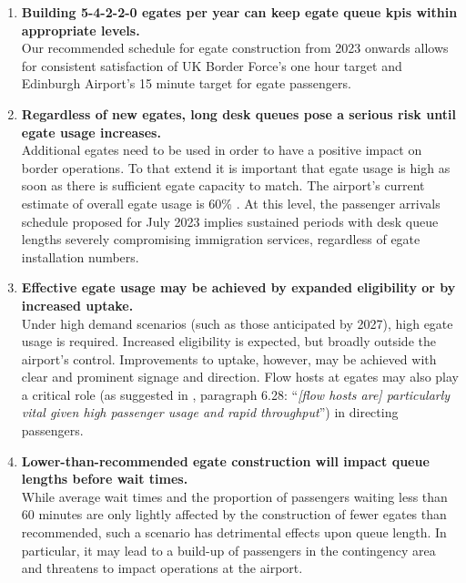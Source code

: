 \documentclass[10pt]{article}
\begin{document}
\vspace{4mm}
\begin{tcolorbox}[
colframe=edi-dark-purple,
colback=edi-light-purple,
fonttitle=\bfseries,
title = {Key Conclusions}]
\begin{enumerate}

    \item[\ding{40}] \textbf{Building 5-4-2-2-0 \glspl{egate} per year can keep \gls{egate} queue \glspl{kpi} within appropriate levels.}\\
    Our recommended schedule for \gls{egate} construction from 2023 onwards allows for consistent satisfaction of UK Border Force's one hour target and Edinburgh Airport's 15 minute target for \gls{egate} passengers.  \\ 
    \item[\ding{40}] \textbf{Regardless of new \glspl{egate}, long desk queues pose a serious risk until \gls{egate} usage increases.}\\
     Additional \glspl{egate} need to be used in order to have a positive impact on border operations. To that extend it is important that \gls{egate} usage is high as soon as there is sufficient \gls{egate} capacity to match. The airport's current estimate of overall \gls{egate} usage is 60\% \cite{modelling_competition}. At this level, the passenger arrivals schedule proposed for July 2023 implies sustained periods with desk queue lengths severely compromising immigration services, regardless of \gls{egate} installation numbers.\\
    
    \item[\ding{40}] \textbf{Effective \gls{egate} usage may be achieved by expanded eligibility or by increased uptake.}\\
    Under high demand scenarios (such as those anticipated by 2027), high \gls{egate} usage is required. Increased eligibility is expected, but broadly outside the airport's control. Improvements to uptake, however, may be achieved with clear and prominent signage and direction. Flow hosts at \glspl{egate} may also play a critical role (as suggested in \cite{Inspection_eGates}, paragraph 6.28: ``\textit{[flow hosts are] particularly vital given high passenger usage and rapid throughput}'') in directing passengers.\\
    
    \item[\ding{40}] \textbf{Lower-than-recommended \gls{egate} construction will impact queue lengths before wait times.}\\
    While average wait times and the proportion of passengers waiting less than 60 minutes are only lightly affected by the construction of fewer \glspl{egate} than recommended, such a scenario has detrimental effects upon queue length. In particular, it may lead to a build-up of passengers in the contingency area and threatens to impact operations at the airport.
\end{enumerate}
\end{tcolorbox}
\end{document}
